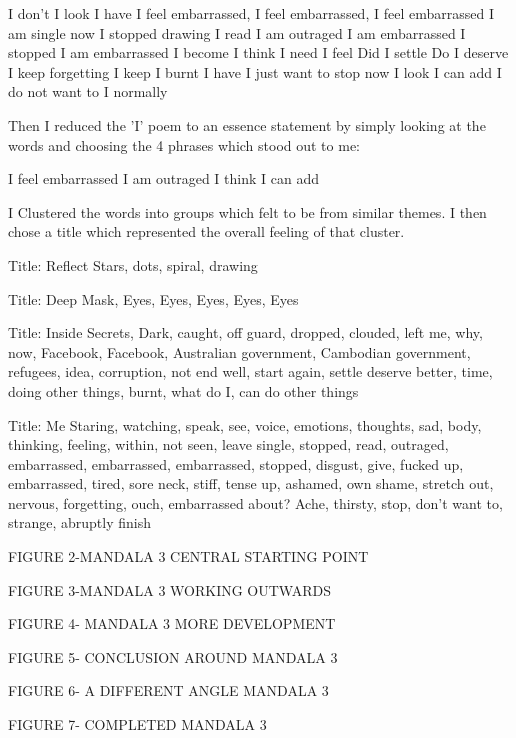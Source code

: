 I don't 
I look 
I have 
I feel embarrassed, I feel embarrassed, I feel embarrassed 
I am single now 
I stopped drawing 
I read 
I am outraged
I am embarrassed 
I stopped 
I am embarrassed
I become 
I think 
I need 
I feel 
Did I settle 
Do I deserve 
I keep forgetting 
I keep
I burnt
I have 
I just want to stop now
I look 
I can add 
I do not want to
I normally 

Then I reduced the 'I' poem to an essence statement by simply looking at the words and choosing the 4 phrases which stood out to me:

I feel embarrassed 
I am outraged
I think
I can add

I Clustered the words into groups which felt to be from similar themes. I then chose a title which represented the overall feeling of that cluster.

Title: Reflect
Stars, dots, spiral, drawing 

Title: Deep
Mask, Eyes, Eyes, Eyes, Eyes, Eyes

Title: Inside 
Secrets, Dark, caught, off guard, dropped, clouded, left me, why, now, Facebook, Facebook, Australian government, Cambodian government, refugees, idea, corruption, not end well, start again, settle deserve better, time, doing other things, burnt, what do I, can do other things

Title: Me
Staring, watching, speak, see, voice, emotions, thoughts, sad, body, thinking, feeling, within, not seen, leave single, stopped, read, outraged, embarrassed, embarrassed, embarrassed, stopped, disgust, give, fucked up, embarrassed, tired, sore neck, stiff, tense up, ashamed, own shame, stretch out, nervous, forgetting, ouch, embarrassed about? Ache, thirsty, stop, don't want to, strange, abruptly finish 


FIGURE 2-MANDALA 3 CENTRAL STARTING POINT

FIGURE 3-MANDALA 3 WORKING OUTWARDS

FIGURE 4- MANDALA 3 MORE DEVELOPMENT

FIGURE 5- CONCLUSION AROUND MANDALA 3

FIGURE 6- A DIFFERENT ANGLE MANDALA 3

FIGURE 7- COMPLETED MANDALA 3


















